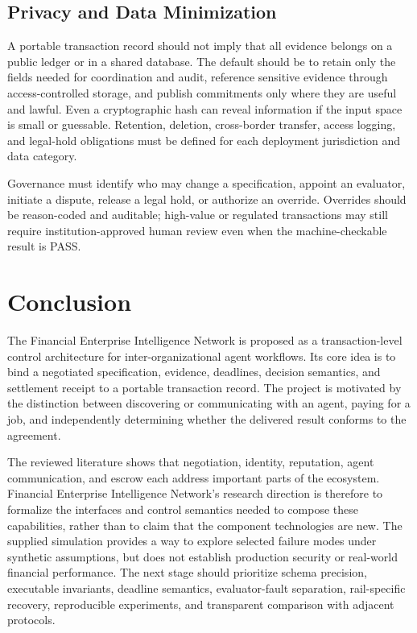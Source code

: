 \documentclass[12pt,a4paper,oneside]{report}
\begin{document}
\section{Privacy and Data Minimization}
A portable transaction record should not imply that all evidence belongs on a public ledger or in a shared database. The default should be to retain only the fields needed for coordination and audit, reference sensitive evidence through access-controlled storage, and publish commitments only where they are useful and lawful. Even a cryptographic hash can reveal information if the input space is small or guessable. Retention, deletion, cross-border transfer, access logging, and legal-hold obligations must be defined for each deployment jurisdiction and data category.

Governance must identify who may change a specification, appoint an evaluator, initiate a dispute, release a legal hold, or authorize an override. Overrides should be reason-coded and auditable; high-value or regulated transactions may still require institution-approved human review even when the machine-checkable result is PASS.

\chapter{Conclusion}
The Financial Enterprise Intelligence Network is proposed as a transaction-level control architecture for inter-organizational agent workflows. Its core idea is to bind a negotiated specification, evidence, deadlines, decision semantics, and settlement receipt to a portable transaction record. The project is motivated by the distinction between discovering or communicating with an agent, paying for a job, and independently determining whether the delivered result conforms to the agreement.

The reviewed literature shows that negotiation, identity, reputation, agent communication, and escrow each address important parts of the ecosystem. Financial Enterprise Intelligence Network's research direction is therefore to formalize the interfaces and control semantics needed to compose these capabilities, rather than to claim that the component technologies are new. The supplied simulation provides a way to explore selected failure modes under synthetic assumptions, but does not establish production security or real-world financial performance. The next stage should prioritize schema precision, executable invariants, deadline semantics, evaluator-fault separation, rail-specific recovery, reproducible experiments, and transparent comparison with adjacent protocols.
\end{document}
